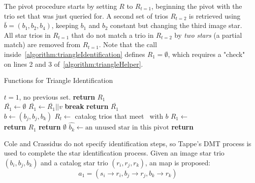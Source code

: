 The pivot procedure starts by setting $R$ to $R_{t=1}$, beginning the pivot with the trio set that was just queried
for.
A second set of trios $R_{t=2}$ is retrieved using $\bar{b} = (b_1, b_2, b_4)$, keeping $b_1$ and $b_2$ constant
but changing the third image star.
All star trios in $R_{t=1}$ that do not match a trio in $R_{t=2}$ by \textit{two stars} (a partial match) are removed
from $R_{t=1}$.
Note that the  call inside~\autoref{algorithm:triangleIdentification}
defines $R_1 = \emptyset$, which requires a "check" on lines 2 and 3 of~\autoref{algorithm:triangleHelper}.

\begin{algorithm} 
    \caption{Functions for Triangle Identification} \label{algorithm:triangleHelper}
    \begin{algorithmic}[1]
         \Comment $t = 1$, no previous set.
        \State \textbf{return} $R_1$
        \EndIf
        \\
        \State $\bar{R_1} \gets \emptyset$
        \State $\bar{R_1} \gets \bar{R_1} || v$
        \State \textbf{break}
        \EndIf
        \EndFor
        \EndFor
        \State \textbf{return} $\bar{R_1}$
        \EndFunction
        \\
        \State $b \gets (b_j, b_j, b_k)$
        \State $R_t \gets $ catalog trios that meet~ with $b$
        \State $R_1 \gets $ 
        \\
        \State \textbf{return} $R_1$
        \State \textbf{return} $\emptyset$
        \Else
        \State $\hat{b_k} \gets \text{an unused star in this pivot}$
        \State \textbf{return} 
        \EndIf
        \EndFunction
    \end{algorithmic}
\end{algorithm}

Cole and Crassidus do not specify identification steps, so Tappe's DMT process is used to complete the star
identification process.
Given an image star trio $(b_i, b_j, b_k)$ and a catalog star trio $(r_i, r_j, r_k)$, an map is proposed:
\begin{equation}
    a_1 = (s_i \rightarrow r_i, b_j \rightarrow r_j, b_k \rightarrow r_k)
\end{equation}


